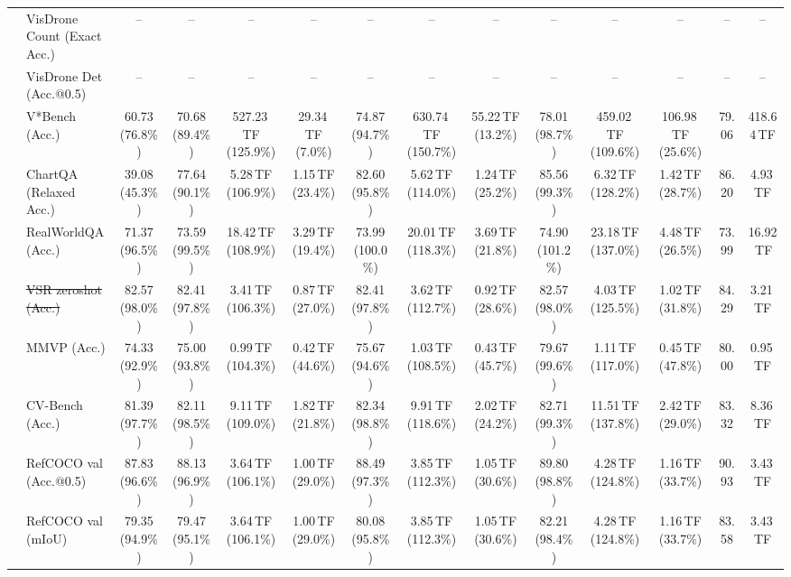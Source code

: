 \begin{table}[t]
\begin{center}
\begin{small}
\begin{sc}
{\begin{tabular}{llcccccccccccc}
& VisDrone Count (Exact Acc.) & -- & -- & -- & -- & -- & -- & -- & -- & -- & -- & -- & -- \\
& VisDrone Det (Acc.@0.5) & -- & -- & -- & -- & -- & -- & -- & -- & -- & -- & -- & -- \\
& V*Bench (Acc.) & 60.73 (76.8\%) & 70.68 (89.4\%) & 527.23\,TF (125.9\%) & 29.34\,TF (7.0\%) & 74.87 (94.7\%) & 630.74\,TF (150.7\%) & 55.22\,TF (13.2\%) & 78.01 (98.7\%) & 459.02\,TF (109.6\%) & 106.98\,TF (25.6\%) & 79.06 & 418.64\,TF \\
\midrule
{}
& ChartQA (Relaxed Acc.) & 39.08 (45.3\%) & 77.64 (90.1\%) & 5.28\,TF (106.9\%) & 1.15\,TF (23.4\%) & 82.60 (95.8\%) & 5.62\,TF (114.0\%) & 1.24\,TF (25.2\%) & 85.56 (99.3\%) & 6.32\,TF (128.2\%) & 1.42\,TF (28.7\%) & 86.20 & 4.93\,TF \\
& RealWorldQA (Acc.) & 71.37 (96.5\%) & 73.59 (99.5\%) & 18.42\,TF (108.9\%) & 3.29\,TF (19.4\%) & 73.99 (100.0\%) & 20.01\,TF (118.3\%) & 3.69\,TF (21.8\%) & 74.90 (101.2\%) & 23.18\,TF (137.0\%) & 4.48\,TF (26.5\%) & 73.99 & 16.92\,TF \\
& \sout{VSR zeroshot (Acc.)} & 82.57 (98.0\%) & 82.41 (97.8\%) & 3.41\,TF (106.3\%) & 0.87\,TF (27.0\%) & 82.41 (97.8\%) & 3.62\,TF (112.7\%) & 0.92\,TF (28.6\%) & 82.57 (98.0\%) & 4.03\,TF (125.5\%) & 1.02\,TF (31.8\%) & 84.29 & 3.21\,TF \\
& MMVP (Acc.) & 74.33 (92.9\%) & 75.00 (93.8\%) & 0.99\,TF (104.3\%) & 0.42\,TF (44.6\%) & 75.67 (94.6\%) & 1.03\,TF (108.5\%) & 0.43\,TF (45.7\%) & 79.67 (99.6\%) & 1.11\,TF (117.0\%) & 0.45\,TF (47.8\%) & 80.00 & 0.95\,TF \\
& CV-Bench (Acc.) & 81.39 (97.7\%) & 82.11 (98.5\%) & 9.11\,TF (109.0\%) & 1.82\,TF (21.8\%) & 82.34 (98.8\%) & 9.91\,TF (118.6\%) & 2.02\,TF (24.2\%) & 82.71 (99.3\%) & 11.51\,TF (137.8\%) & 2.42\,TF (29.0\%) & 83.32 & 8.36\,TF \\
& RefCOCO val (Acc.@0.5) & 87.83 (96.6\%) & 88.13 (96.9\%) & 3.64\,TF (106.1\%) & 1.00\,TF (29.0\%) & 88.49 (97.3\%) & 3.85\,TF (112.3\%) & 1.05\,TF (30.6\%) & 89.80 (98.8\%) & 4.28\,TF (124.8\%) & 1.16\,TF (33.7\%) & 90.93 & 3.43\,TF \\
& RefCOCO val (mIoU) & 79.35 (94.9\%) & 79.47 (95.1\%) & 3.64\,TF (106.1\%) & 1.00\,TF (29.0\%) & 80.08 (95.8\%) & 3.85\,TF (112.3\%) & 1.05\,TF (30.6\%) & 82.21 (98.4\%) & 4.28\,TF (124.8\%) & 1.16\,TF (33.7\%) & 83.58 & 3.43\,TF \\

\end{tabular}}
\end{sc}
\end{small}
\end{center}
\end{table}
